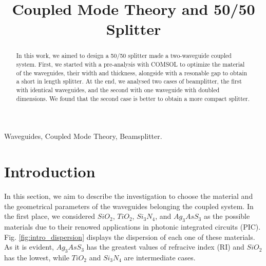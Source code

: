 \documentclass[conference, a4paper]{IEEEtran}
\begin{document}
\title{Coupled Mode Theory and 50/50 Splitter}

\author{
\and
{}
}

\maketitle

\begin{abstract}
    In this work, we aimed to design a 50/50 splitter made a two-waveguide coupled system. First, we started with a pre-analysis with COMSOL to optimize the material of the waveguides, their width and thickness, alongside with a resonable gap to obtain a short in length splitter. At the end, we analysed two cases of beamplitter, the first with identical waveguides, and the second with one waveguide with doubled dimensions. We found that the second case is better to obtain a more compact splitter.
\end{abstract}

\begin{IEEEkeywords}
    Waveguides, Coupled Mode Theory, Beamsplitter.
\end{IEEEkeywords}

\section{Introduction}
\label{sec:intro}

In this section, we aim to describe the investigation to choose the material and the geometrical parameters of the waveguides belonging the coupled system. In the first place, we considered $SiO_2$, $TiO_2$, $Si_3N_4$, and $Ag_3AsS_3$ as the possible materials due to their renowed applications in photonic integrated circuits (PIC). Fig. \ref{fig:intro_dispersion} displays the dispersion of each one of these materials. As it is evident, $Ag_3AsS_3$ has the greatest values of refracive index (RI) and $SiO_2$ has the lowest, while $TiO_2$ and $Si_3N_4$ are intermediate cases. 
\end{document}
